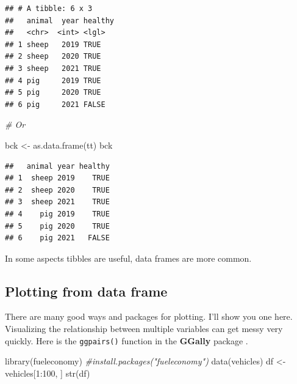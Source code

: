 \documentclass[
]{book}
\newenvironment{Shaded}{\begin{snugshade}}{\end{snugshade}}
\newcommand{\CommentTok}[1]{\textcolor[rgb]{0.56,0.35,0.01}{\textit{#1}}}
\newcommand{\DecValTok}[1]{\textcolor[rgb]{0.00,0.00,0.81}{#1}}
\newcommand{\FunctionTok}[1]{\textcolor[rgb]{0.00,0.00,0.00}{#1}}
\newcommand{\NormalTok}[1]{#1}
\newcommand{\OtherTok}[1]{\textcolor[rgb]{0.56,0.35,0.01}{#1}}
\newcommand{\SpecialCharTok}[1]{\textcolor[rgb]{0.00,0.00,0.00}{#1}}
\theoremstyle{definition}
\theoremstyle{definition}
\theoremstyle{definition}
\theoremstyle{definition}
\theoremstyle{remark}
\begin{document}
\begin{verbatim}
## # A tibble: 6 x 3
##   animal  year healthy
##   <chr>  <int> <lgl>  
## 1 sheep   2019 TRUE   
## 2 sheep   2020 TRUE   
## 3 sheep   2021 TRUE   
## 4 pig     2019 TRUE   
## 5 pig     2020 TRUE   
## 6 pig     2021 FALSE
\end{verbatim}

\begin{Shaded}
\begin{Highlighting}[]
\CommentTok{\# Or}

\NormalTok{bck }\OtherTok{\textless{}{-}} \FunctionTok{as.data.frame}\NormalTok{(tt)}
\NormalTok{bck}
\end{Highlighting}
\end{Shaded}

\begin{verbatim}
##   animal year healthy
## 1  sheep 2019    TRUE
## 2  sheep 2020    TRUE
## 3  sheep 2021    TRUE
## 4    pig 2019    TRUE
## 5    pig 2020    TRUE
## 6    pig 2021   FALSE
\end{verbatim}

In some aspects tibbles are useful, data frames are more common.

\hypertarget{plotting-from-data-frame}{%
\subsection{Plotting from data frame}\label{plotting-from-data-frame}}

There are many good ways and packages for plotting. I'll show you one here. Visualizing the relationship between multiple variables can get messy very quickly. Here is the \texttt{ggpairs()} function in the \textbf{GGally} package \citep{Tay_2019}.

\begin{Shaded}
\begin{Highlighting}[]
\FunctionTok{library}\NormalTok{(fueleconomy)  }\CommentTok{\#install.packages("fueleconomy")}
\FunctionTok{data}\NormalTok{(vehicles)}
\NormalTok{df }\OtherTok{\textless{}{-}}\NormalTok{ vehicles[}\DecValTok{1}\SpecialCharTok{:}\DecValTok{100}\NormalTok{, ]}
\FunctionTok{str}\NormalTok{(df)}
\end{Highlighting}
\end{Shaded}
\end{document}
